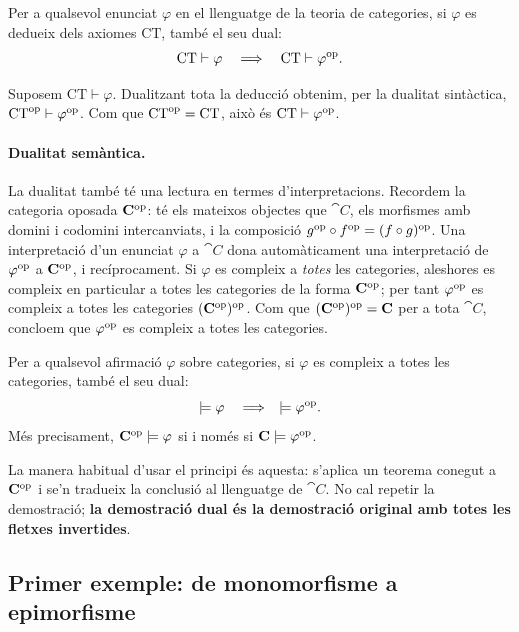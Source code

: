 \begin{teorema}\label{teo:dualitat-sint}
Per a qualsevol enunciat $\varphi$ en el llenguatge de la teoria de categories, si $\varphi$ es dedueix dels axiomes $\mathrm{CT}$, també el seu dual:
\[
\mathrm{CT}\vdash\varphi \quad\Longrightarrow\quad \mathrm{CT}\vdash\varphi^{\mathrm{op}}.
\]
\end{teorema}

\begin{prova}
Suposem $\mathrm{CT}\vdash\varphi$. Dualitzant tota la deducció obtenim, per la dualitat sintàctica, $\mathrm{CT}^{\mathrm{op}}\vdash\varphi^{\mathrm{op}}$. Com que $\mathrm{CT}^{\mathrm{op}}=\mathrm{CT}$, això és $\mathrm{CT}\vdash\varphi^{\mathrm{op}}$.
\end{prova}

\paragraph{Dualitat semàntica.}
La dualitat també té una lectura en termes d'interpretacions. Recordem la categoria oposada $\mathbf{C}^{\mathrm{op}}$: té els mateixos objectes que $\cat{C}$, els morfismes amb domini i codomini intercanviats, i la composició $g^{\mathrm{op}}\circ f^{\mathrm{op}}=(f\circ g)^{\mathrm{op}}$. Una interpretació d'un enunciat $\varphi$ a $\cat{C}$ dona automàticament una interpretació de $\varphi^{\mathrm{op}}$ a $\mathbf{C}^{\mathrm{op}}$, i recíprocament. Si $\varphi$ es compleix a \emph{totes} les categories, aleshores es compleix en particular a totes les categories de la forma $\mathbf{C}^{\mathrm{op}}$; per tant $\varphi^{\mathrm{op}}$ es compleix a totes les categories $(\mathbf{C}^{\mathrm{op}})^{\mathrm{op}}$. Com que $(\mathbf{C}^{\mathrm{op}})^{\mathrm{op}}=\mathbf{C}$ per a tota $\cat{C}$, concloem que $\varphi^{\mathrm{op}}$ es compleix a totes les categories.

\begin{teorema}\label{teo:dualitat-sem}
Per a qualsevol afirmació $\varphi$ sobre categories, si $\varphi$ es compleix a totes les categories, també el seu dual:
\[
\models\varphi \quad\Longrightarrow\quad \models\varphi^{\mathrm{op}}.
\]
Més precisament, $\mathbf{C}^{\mathrm{op}}\models\varphi$ si i només si $\mathbf{C}\models\varphi^{\mathrm{op}}$.
\end{teorema}

La manera habitual d'usar el principi és aquesta: s'aplica un teorema conegut a $\mathbf{C}^{\mathrm{op}}$ i se'n tradueix la conclusió al llenguatge de $\cat{C}$. No cal repetir la demostració; \textbf{la demostració dual és la demostració original amb totes les fletxes invertides}.

\subsection{Primer exemple: de monomorfisme a epimorfisme}

